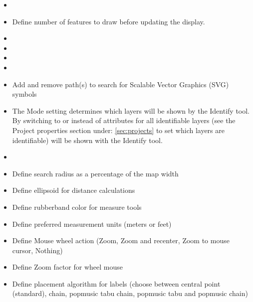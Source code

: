 
\begin{itemize}
\item {}
\item Define number of features to draw before updating the display.
\item {}
\item {}
\item {}
\item {}
\item Add and remove path(s) to search for Scalable Vector Graphics (SVG)
symbols
\end{itemize}


\begin{itemize}
\item The Mode setting determines which layers will be shown by the Identify
tool. By switching to  or  instead of  attributes for all identifiable
layers (see the Project properties section under: \ref{sec:projects} to set
which layers are identifiable) will be shown with the Identify tool.
\item {}
\item Define search radius as a percentage of the map width
\item Define ellipsoid for distance calculations
\item Define rubberband color for measure tools
\item Define preferred measurement units (meters or feet)
\item Define Mouse wheel action (Zoom, Zoom and recenter, Zoom to mouse
cursor, Nothing)
\item Define Zoom factor for wheel mouse
\end{itemize}


\begin{itemize}
\item Define placement algorithm for labels (choose between central point
(standard), chain, popmusic tabu chain, popmusic tabu and popmusic chain)
\end{itemize}

